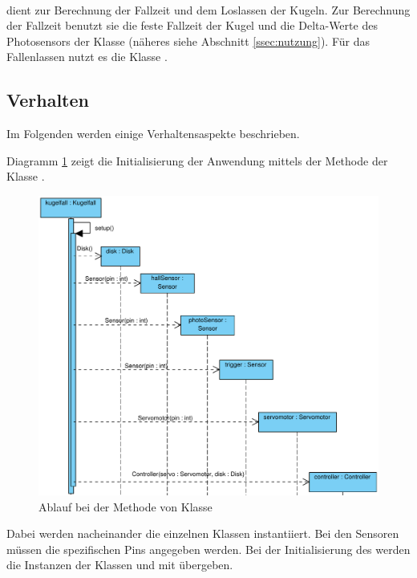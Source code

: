 \paragraph{} dient zur Berechnung der Fallzeit und dem Loslassen der Kugeln.
Zur Berechnung der Fallzeit benutzt sie die feste Fallzeit der Kugel  und die Delta-Werte des Photosensors der Klasse  (näheres siehe Abschnitt \ref{ssec:nutzung}).
Für das Fallenlassen nutzt es die Klasse .

\subsection{Verhalten}
Im Folgenden werden einige Verhaltensaspekte beschrieben.

Diagramm \ref{fig:setup_diagram} zeigt die Initialisierung der Anwendung mittels der Methode  der Klasse .
\begin{figure}[htbp]
	\centering
	\includegraphics[width=\linewidth]{abb/setup_cropped}
	\caption{Ablauf bei der Methode  von Klasse }
	\label{fig:setup_diagram}
\end{figure}
Dabei werden nacheinander die einzelnen Klassen instantiiert. 
Bei den Sensoren müssen die spezifischen Pins angegeben werden.
Bei der Initialisierung des  werden die Instanzen der Klassen  und  mit übergeben.

